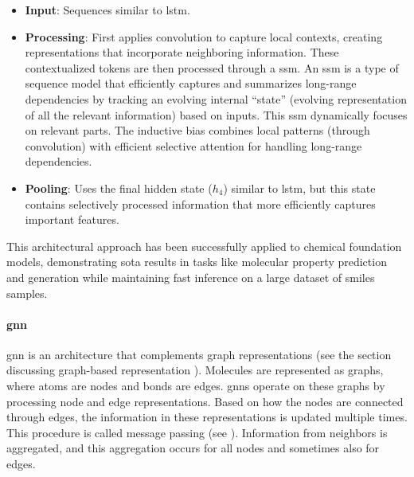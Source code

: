 \begin{itemize}
    \item \textbf{Input}:  Sequences similar to \gls{lstm}.
    \item \textbf{Processing}:  First applies convolution to capture local contexts, creating representations that incorporate neighboring information. These contextualized tokens are then processed through a \gls{ssm}. An \gls{ssm} is a type of sequence model that efficiently captures and summarizes long-range dependencies by tracking an evolving internal \enquote{state} (evolving representation of all the relevant information) based on inputs. This \gls{ssm} dynamically focuses on relevant parts. The inductive bias combines local patterns (through convolution) with efficient selective attention for handling long-range dependencies.
    \item \textbf{Pooling}:  Uses the final hidden state ($h_{4}$) similar to \gls{lstm}, but this state contains selectively processed information that more efficiently captures important features.
\end{itemize}
This architectural approach has been successfully applied to chemical foundation models, demonstrating \gls{sota} results in tasks like molecular property prediction and generation while maintaining fast inference on a large dataset of \gls{smiles} samples.\autocite{soares2025mamba-based} 



\paragraph{\gls{gnn}}
\gls{gnn} is an architecture that complements graph representations (see the section discussing graph-based representation ). Molecules are represented as graphs, where atoms are nodes and bonds are edges. \glspl{gnn} operate on these graphs by processing node and edge representations. Based on how the nodes are connected through edges, the information in these representations is updated multiple times. This procedure is called message passing (see ). Information from neighbors is aggregated, and this aggregation occurs for all nodes and sometimes also for edges.

